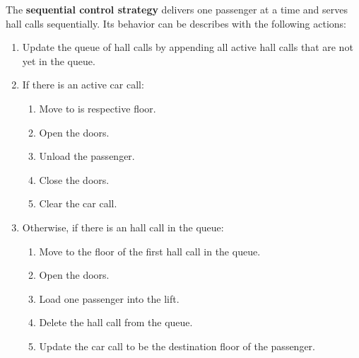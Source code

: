 The \textbf{sequential control strategy} delivers one passenger at a time and serves hall calls sequentially. 
Its behavior can be describes with the following actions:
\begin{enumerate}[noitemsep]
    \item Update the queue of hall calls by appending all active hall calls that are not yet in the queue.
    \item If there is an active car call:
    \begin{enumerate}[noitemsep]
        \item Move to is respective floor.
        \item Open the doors.
        \item Unload the passenger. 
        \item Close the doors. 
        \item Clear the car call.
    \end{enumerate}
    \item Otherwise, if there is an hall call in the queue:
    \begin{enumerate}[noitemsep]
        \item Move to the floor of the first hall call in the queue. 
        \item Open the doors.
        \item Load one passenger into the lift. 
        \item Delete the hall call from the queue.
        \item Update the car call to be the destination floor of the passenger.
    \end{enumerate}
\end{enumerate}

